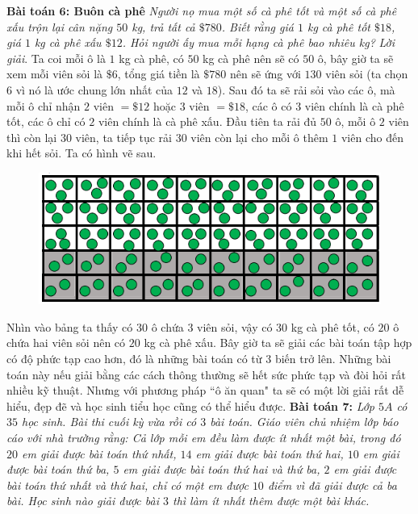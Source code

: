 \begin{multicols}{2}
\begin{figure}[H]
		\vspace*{-15pt}
	\end{figure}
	\textbf{\color{diendantoanhoc}Bài toán $\pmb6$: Buôn cà phê}
	\vskip 0.1cm
	\textit{Người nọ mua một số cà phê tốt và một số cà phê xấu trộn lại cân nặng $50$ kg, trả tất cả $\$780$. Biết rằng giá $1$ kg cà phê tốt $\$18$, giá $1$ kg cà phê xấu $\$12$. Hỏi người ấy mua mỗi hạng cà phê bao nhiêu kg?}
	\vskip 0.1cm
	\textit{Lời giải}.
	Ta coi mỗi ô là $1$ kg cà phê, có $50$ kg cà phê nên sẽ có $50$ ô, bây giờ ta sẽ xem mỗi viên sỏi là $\$6$, tổng giá tiền là $\$780$ nên sẽ ứng với $130$ viên sỏi (ta chọn $6$ vì nó là ước chung lớn nhất của $12$ và $18$). Sau đó ta sẽ rải sỏi vào các ô, mà mỗi ô chỉ nhận $2$ viên $=\$12$ hoặc $3 $ viên $= \$18$, các ô có $3$ viên chính là cà phê tốt, các ô chỉ có $2$ viên chính là cà phê xấu. Đầu tiên ta rải đủ $50$ ô, mỗi ô $2$ viên thì còn lại $30$ viên, ta tiếp tục rải $30$ viên còn lại cho mỗi ô thêm $1$ viên cho đến khi hết sỏi. Ta có hình vẽ sau.
	\begin{figure}[H]
		\vspace*{5pt}
		\centering
		\captionsetup{labelformat= empty, justification=centering}
		\includegraphics[width= 1\linewidth]{6}
		\vspace*{-15pt}
	\end{figure}
	Nhìn vào bảng ta thấy có $30$ ô chứa $3$ viên sỏi, vậy có $30$ kg cà phê tốt, có $20$ ô chứa hai viên sỏi nên có $20$ kg cà phê xấu.
	\vskip 0.1cm
	Bây giờ ta sẽ giải các bài toán tập hợp có độ phức tạp cao hơn, đó là những bài toán có từ $3$ biến trở lên. Những bài toán này nếu giải bằng các cách thông thường sẽ hết sức phức tạp và đòi hỏi rất nhiều kỹ thuật. Nhưng với phương pháp ``ô ăn quan" ta sẽ có một lời giải rất dễ hiểu, đẹp đẽ và học sinh tiểu học cũng có thể hiểu được.
	\vskip 0.1cm
	\textbf{\color{diendantoanhoc}Bài toán $\pmb7$:}
	\vskip 0.1cm
	\textit{Lớp $5A$ có $35$ học sinh. Bài thi cuối kỳ vừa rồi có $3$ bài toán. Giáo viên chủ nhiệm lớp báo cáo với nhà trường rằng: Cả lớp mỗi em đều làm được ít nhất một bài, trong đó $20$ em giải được bài toán thứ nhất, $14$ em giải được bài toán thứ hai, $10$ em giải được bài toán thứ ba, $5$ em giải được bài toán thứ hai và thứ ba, $2$ em giải được bài toán thứ nhất và thứ hai, chỉ có một em được $10$ điểm vì đã giải được cả ba bài. Học sinh nào giải được bài $3$ thì làm ít nhất thêm được một bài khác.
}
\end{multicols}
